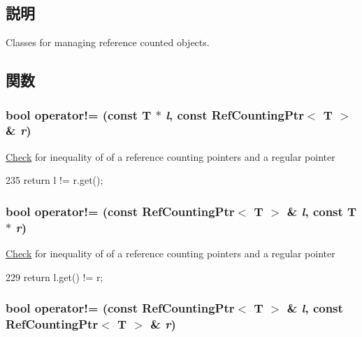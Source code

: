 \subsection{説明}
Classes for managing reference counted objects. 

\subsection{関数}
\hypertarget{refcnt_8hh_a9bec8412054511ee771c632a0e62db6d}{
\subsubsection[{operator!=}]{\setlength{\rightskip}{0pt plus 5cm}bool operator!= (const T $\ast$ {\em l}, \/  const {\bf RefCountingPtr}$<$ T $>$ \& {\em r})}}
\label{refcnt_8hh_a9bec8412054511ee771c632a0e62db6d}
\hyperlink{classCheck}{Check} for inequality of of a reference counting pointers and a regular pointer 


\begin{DoxyCode}
235 { return l != r.get(); }
\end{DoxyCode}
\hypertarget{refcnt_8hh_a9d52e3c3b48f1f3a45c3774943b7368f}{
\subsubsection[{operator!=}]{\setlength{\rightskip}{0pt plus 5cm}bool operator!= (const {\bf RefCountingPtr}$<$ T $>$ \& {\em l}, \/  const T $\ast$ {\em r})}}
\label{refcnt_8hh_a9d52e3c3b48f1f3a45c3774943b7368f}
\hyperlink{classCheck}{Check} for inequality of of a reference counting pointers and a regular pointer 


\begin{DoxyCode}
229 { return l.get() != r; }
\end{DoxyCode}
\hypertarget{refcnt_8hh_a096e1231a0265dde049419eeb46b8055}{
\subsubsection[{operator!=}]{\setlength{\rightskip}{0pt plus 5cm}bool operator!= (const {\bf RefCountingPtr}$<$ T $>$ \& {\em l}, \/  const {\bf RefCountingPtr}$<$ T $>$ \& {\em r})}}
\label{refcnt_8hh_a096e1231a0265dde049419eeb46b8055}


